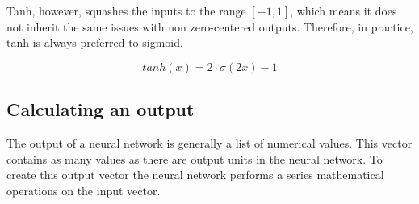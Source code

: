 Tanh, however, squashes the inputs to the range $[-1, 1]$, which means it does not inherit the same issues with non zero-centered outputs. Therefore, in practice, tanh is always preferred to sigmoid. \cite{_neural_2018}

\begin{equation}
    tanh(x) = 2 \cdot \sigma(2x) - 1
\end{equation}

\subsection{Calculating an output}
\label{calculating_an_output}

The output of a neural network is generally a list of numerical values. This vector contains as many values as there are output units in the neural network. To create this output vector the neural network performs a series mathematical operations on the input vector. 

